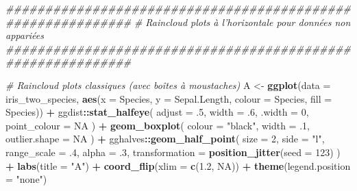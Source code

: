 \documentclass[
  french,
]{book}
\newenvironment{Shaded}{\begin{snugshade}}{\end{snugshade}}
\newcommand{\CommentTok}[1]{\textcolor[rgb]{0.56,0.35,0.01}{\textit{#1}}}
\newcommand{\DataTypeTok}[1]{\textcolor[rgb]{0.13,0.29,0.53}{#1}}
\newcommand{\DecValTok}[1]{\textcolor[rgb]{0.00,0.00,0.81}{#1}}
\newcommand{\FloatTok}[1]{\textcolor[rgb]{0.00,0.00,0.81}{#1}}
\newcommand{\KeywordTok}[1]{\textcolor[rgb]{0.13,0.29,0.53}{\textbf{#1}}}
\newcommand{\NormalTok}[1]{#1}
\newcommand{\OperatorTok}[1]{\textcolor[rgb]{0.81,0.36,0.00}{\textbf{#1}}}
\newcommand{\OtherTok}[1]{\textcolor[rgb]{0.56,0.35,0.01}{#1}}
\newcommand{\StringTok}[1]{\textcolor[rgb]{0.31,0.60,0.02}{#1}}
\begin{document}
\begin{Shaded}
\begin{Highlighting}[]
\CommentTok{############################################################}
\CommentTok{# Raincloud plots à l'horizontale pour données non appariées}
\CommentTok{############################################################}

\CommentTok{# Raincloud plots classiques (avec boîtes à moustaches)}
\NormalTok{A <-}
\StringTok{  }\KeywordTok{ggplot}\NormalTok{(}\DataTypeTok{data =}\NormalTok{ iris_two_species, }
         \KeywordTok{aes}\NormalTok{(}\DataTypeTok{x =}\NormalTok{ Species, }\DataTypeTok{y =}\NormalTok{ Sepal.Length, }\DataTypeTok{colour =}\NormalTok{ Species, }\DataTypeTok{fill =}\NormalTok{ Species)) }\OperatorTok{+}
\StringTok{  }\NormalTok{ggdist}\OperatorTok{::}\KeywordTok{stat_halfeye}\NormalTok{(}
    \DataTypeTok{adjust =} \FloatTok{.5}\NormalTok{, }
    \DataTypeTok{width =} \FloatTok{.6}\NormalTok{, }
    \DataTypeTok{.width =} \DecValTok{0}\NormalTok{, }
    \DataTypeTok{point_colour =} \OtherTok{NA}
\NormalTok{    ) }\OperatorTok{+}
\StringTok{  }\KeywordTok{geom_boxplot}\NormalTok{(}
    \DataTypeTok{colour =} \StringTok{"black"}\NormalTok{,}
    \DataTypeTok{width =} \FloatTok{.1}\NormalTok{, }
    \DataTypeTok{outlier.shape =} \OtherTok{NA}
\NormalTok{  ) }\OperatorTok{+}
\StringTok{  }\NormalTok{gghalves}\OperatorTok{::}\KeywordTok{geom_half_point}\NormalTok{(}
    \DataTypeTok{size =} \DecValTok{2}\NormalTok{, }
    \DataTypeTok{side =} \StringTok{"l"}\NormalTok{, }
    \DataTypeTok{range_scale =} \FloatTok{.4}\NormalTok{, }
    \DataTypeTok{alpha =} \FloatTok{.3}\NormalTok{,}
    \DataTypeTok{transformation =} \KeywordTok{position_jitter}\NormalTok{(}\DataTypeTok{seed =} \DecValTok{123}\NormalTok{)}
\NormalTok{  ) }\OperatorTok{+}
\StringTok{  }\KeywordTok{labs}\NormalTok{(}\DataTypeTok{title =} \StringTok{"A"}\NormalTok{) }\OperatorTok{+}
\StringTok{  }\KeywordTok{coord_flip}\NormalTok{(}\DataTypeTok{xlim =} \KeywordTok{c}\NormalTok{(}\FloatTok{1.2}\NormalTok{, }\OtherTok{NA}\NormalTok{)) }\OperatorTok{+}
\StringTok{  }\KeywordTok{theme}\NormalTok{(}\DataTypeTok{legend.position =} \StringTok{"none"}\NormalTok{)}



\end{Highlighting}
\end{Shaded}
\end{document}
